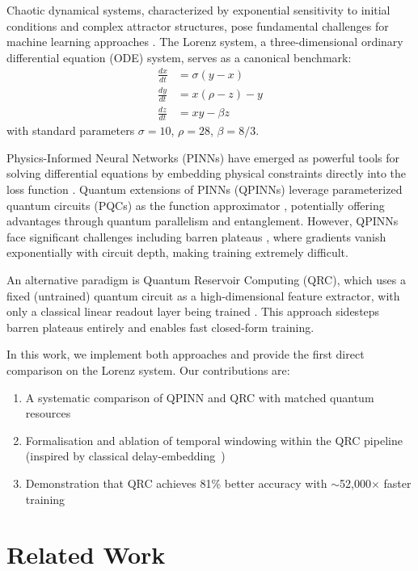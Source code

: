 \documentclass[11pt,a4paper]{article}
\begin{document}
Chaotic dynamical systems, characterized by exponential sensitivity to initial conditions and complex attractor structures, pose fundamental challenges for machine learning approaches \cite{lorenz1963}. The Lorenz system, a three-dimensional ordinary differential equation (ODE) system, serves as a canonical benchmark:
\begin{align}
    \frac{dx}{dt} &= \sigma(y - x) \label{eq:lorenz1}\\
    \frac{dy}{dt} &= x(\rho - z) - y \label{eq:lorenz2}\\
    \frac{dz}{dt} &= xy - \beta z \label{eq:lorenz3}
\end{align}
with standard parameters $\sigma = 10$, $\rho = 28$, $\beta = 8/3$.

Physics-Informed Neural Networks (PINNs) have emerged as powerful tools for solving differential equations by embedding physical constraints directly into the loss function \cite{raissi2019}. Quantum extensions of PINNs (QPINNs) leverage parameterized quantum circuits (PQCs) as the function approximator \cite{qcpinn2024}, potentially offering advantages through quantum parallelism and entanglement. However, QPINNs face significant challenges including barren plateaus \cite{mcclean2018}, where gradients vanish exponentially with circuit depth, making training extremely difficult.

An alternative paradigm is Quantum Reservoir Computing (QRC), which uses a fixed (untrained) quantum circuit as a high-dimensional feature extractor, with only a classical linear readout layer being trained \cite{fujii2017,mujal2021}. This approach sidesteps barren plateaus entirely and enables fast closed-form training.

In this work, we implement both approaches and provide the first direct comparison on the Lorenz system. Our contributions are:
\begin{enumerate}
    \item A systematic comparison of QPINN and QRC with matched quantum resources
    \item Formalisation and ablation of temporal windowing within the QRC pipeline (inspired by classical delay-embedding~\cite{takens1981})
    \item Demonstration that QRC achieves 81\% better accuracy with ${\sim}$52,000$\times$ faster training
\end{enumerate}

\section{Related Work}
\end{document}
